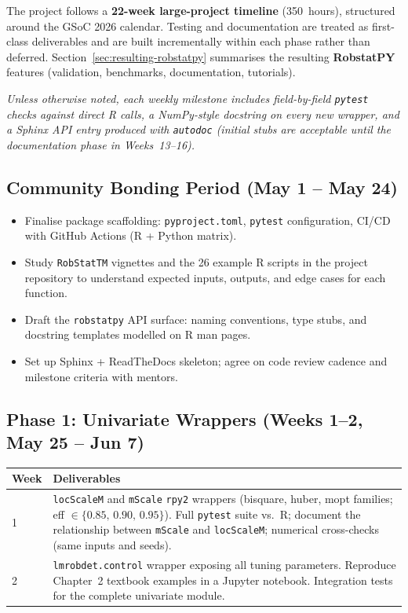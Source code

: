 \documentclass[11pt, a4paper]{article}
\begin{document}
The project follows a \textbf{22-week large-project timeline}
(350~hours), structured around the GSoC 2026 calendar. Testing and
documentation are treated as first-class deliverables and are built
incrementally within each phase rather than deferred.
Section~\ref{sec:resulting-robstatpy} summarises the resulting
\textbf{RobstatPY} features (validation, benchmarks, documentation, tutorials).

\medskip
\noindent\textit{Unless otherwise noted, each weekly milestone includes
field-by-field \texttt{pytest} checks against direct R calls, a NumPy-style
docstring on every new wrapper, and a Sphinx API entry produced with
\texttt{autodoc} (initial stubs are acceptable until the documentation
phase in Weeks~13--16).}

\subsection{Community Bonding Period (May 1 -- May 24)}

\begin{itemize}[leftmargin=1.5em, itemsep=2pt]
  \item Finalise package scaffolding: \texttt{pyproject.toml},
    \texttt{pytest} configuration, CI/CD with GitHub Actions
    (R + Python matrix).
  \item Study \texttt{RobStatTM} vignettes and the 26 example R scripts
    in the project repository to understand expected inputs, outputs,
    and edge cases for each function.
  \item Draft the \texttt{robstatpy} API surface: naming conventions,
    type stubs, and docstring templates modelled on R man pages.
  \item Set up Sphinx + ReadTheDocs skeleton; agree on code review
    cadence and milestone criteria with mentors.
\end{itemize}

\subsection{Phase 1: Univariate Wrappers (Weeks 1--2, May 25 -- Jun 7)}

\begin{tabularx}{\linewidth}{@{} l X @{}}
  \toprule
  \textbf{Week} & \textbf{Deliverables} \\
  \midrule
  1 & \texttt{locScaleM} and \texttt{mScale} \texttt{rpy2} wrappers
    (bisquare, huber, mopt families; eff $\in \{0.85,\,0.90,\,0.95\}$).
    Full \texttt{pytest} suite vs.\ R; document the relationship between
    \texttt{mScale} and \texttt{locScaleM}; numerical cross-checks (same
    inputs and seeds). \\
  2 & \texttt{lmrobdet.control} wrapper exposing all tuning parameters.
    Reproduce Chapter~2 textbook examples in a Jupyter notebook.
    Integration tests for the complete univariate module. \\
  \bottomrule
\end{tabularx}
\end{document}
